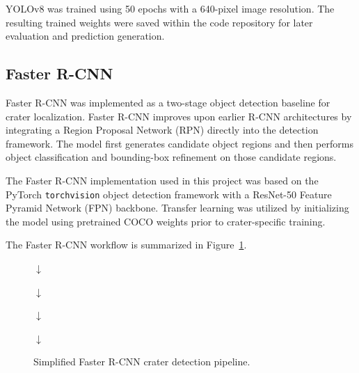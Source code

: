 \documentclass[conference]{IEEEtran}
\begin{document}
	YOLOv8 was trained using 50 epochs with a 640-pixel image resolution. The resulting trained weights were saved within the code repository for later evaluation and prediction generation.
	
	\subsection{Faster R-CNN}
	
	Faster R-CNN was implemented as a two-stage object detection baseline for crater localization. Faster R-CNN improves upon earlier R-CNN architectures by integrating a Region Proposal Network (RPN) directly into the detection framework. The model first generates candidate object regions and then performs object classification and bounding-box refinement on those candidate regions.
	
	The Faster R-CNN implementation used in this project was based on the PyTorch \texttt{torchvision} object detection framework with a ResNet-50 Feature Pyramid Network (FPN) backbone. Transfer learning was utilized by initializing the model using pretrained COCO weights prior to crater-specific training.
	
	The Faster R-CNN workflow is summarized in Figure~\ref{fig:fasterrcnn_pipeline}.
	
	\begin{figure}[h]
		\centering
		
		
		\vspace{0.15cm}
		
		$\downarrow$
		
		\vspace{0.15cm}
		
		
		\vspace{0.15cm}
		
		$\downarrow$
		
		\vspace{0.15cm}
		
		
		\vspace{0.15cm}
		
		$\downarrow$
		
		\vspace{0.15cm}
		
		
		\vspace{0.15cm}
		
		$\downarrow$
		
		\vspace{0.15cm}
		
		
		\caption{Simplified Faster R-CNN crater detection pipeline.}
		\label{fig:fasterrcnn_pipeline}
		
	\end{figure}
	
\end{document}
